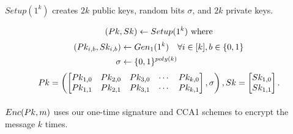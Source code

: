 \paragraph{\Setup}  $Setup(1^k)$ creates $2k$ public keys, random bits $\sigma$, and $2k$ private keys.

\[
 (Pk, Sk) \leftarrow Setup(1^k)  \text{ where}
\]
\begin{align*}
 (Pk_{i,b}, Sk_{i,b}) &\leftarrow Gen_1(1^k) \quad \forall i \in [k], b \in \{0,1\} \\
                     \sigma &\leftarrow \{0,1\}^{poly(k)}
\end{align*}
\[
Pk = \left(
\begin{bmatrix}
Pk_{1,0}  & Pk_{2,0}  & Pk_{3,0}  & \cdots  & Pk_{k,0}  \\
Pk_{1,1}  & Pk_{2,1}  & Pk_{3,1}  & \cdots  & Pk_{k,1}  \\
\end{bmatrix}, \sigma  \right),
Sk =
\begin{bmatrix}
Sk_{1,0}  \\
Sk_{1,1} \\
\end{bmatrix}.
\]


\paragraph{\Enc} $Enc(Pk, m)$ uses our one-time signature and CCA1 schemes to encrypt the message $k$ times.



